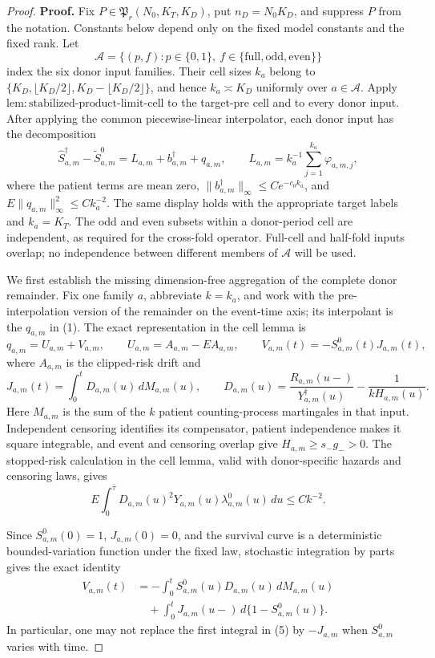 \documentclass{article}
\begin{document}
\begin{proof}
\textbf{Proof.}
Fix \(P\in\mathfrak P_r(N_0,K_T,K_D)\), put
\(n_D=N_0K_D\), and suppress \(P\) from the notation.  Constants below
depend only on the fixed model constants and the fixed rank.  Let
\[
 \mathscr A=\{(p,f):p\in\{0,1\},\
 f\in\{\mathrm{full},\mathrm{odd},\mathrm{even}\}\}
\]
index the six donor input families.  Their cell sizes \(k_a\) belong to
\(\{K_D,\lfloor K_D/2\rfloor,K_D-\lfloor K_D/2\rfloor\}\), and hence
\(k_a\asymp K_D\) uniformly over \(a\in\mathscr A\).  Apply
\(\mathrm{lem:stabilized\mbox{-}product\mbox{-}limit\mbox{-}cell}\) to
the target-pre cell and to every donor input.  After applying the common
piecewise-linear interpolator, each donor input has the decomposition
\[
 \widehat S_{a,m}^{\dagger}-\widetilde S^0_{a,m}
 =L_{a,m}+b_{a,m}^{\dagger}+q_{a,m},
 \qquad
 L_{a,m}=k_a^{-1}\sum_{j=1}^{k_a}\varphi_{a,m,j},       \tag{1}
\]
where the patient terms are mean zero,
\(\|b_{a,m}^{\dagger}\|_\infty\leq Ce^{-c_0k_a}\), and
\(E\|q_{a,m}\|_\infty^2\leq Ck_a^{-2}\).  The same display holds with
the appropriate target labels and \(k_a=K_T\).  The odd and even subsets
within a donor-period cell are independent, as required for the cross-fold
operator.  Full-cell and half-fold inputs overlap; no independence between
different members of \(\mathscr A\) will be used.

We first establish the missing dimension-free aggregation of the complete
donor remainder.  Fix one family \(a\), abbreviate \(k=k_a\), and work with
the pre-interpolation version of the remainder on the event-time axis; its
interpolant is the \(q_{a,m}\) in (1).  The exact representation in the cell
lemma is
\[
 q_{a,m}=U_{a,m}+V_{a,m},
 \qquad
 U_{a,m}=A_{a,m}-EA_{a,m},
 \qquad
 V_{a,m}(t)=-S^0_{a,m}(t)J_{a,m}(t),                   \tag{2}
\]
where \(A_{a,m}\) is the clipped-risk drift and
\[
 J_{a,m}(t)=\int_0^tD_{a,m}(u)\,dM_{a,m}(u),
 \qquad
 D_{a,m}(u)=\frac{R_{a,m}(u-)}{Y_{a,m}^{\dagger}(u)}
             -\frac{1}{kH_{a,m}(u)}.                  \tag{3}
\]
Here \(M_{a,m}\) is the sum of the \(k\) patient counting-process
martingales in that input.  Independent censoring identifies its compensator,
patient independence makes it square integrable, and event and censoring
overlap give \(H_{a,m}\geq s_-g_->0\).  The stopped-risk calculation in
the cell lemma, valid with donor-specific hazards and censoring laws, gives
\[
 E\int_0^{\bar\tau}D_{a,m}(u)^2Y_{a,m}(u)
       \lambda^0_{a,m}(u)\,du\leq Ck^{-2}.             \tag{4}
\]

Since \(S^0_{a,m}(0)=1\), \(J_{a,m}(0)=0\), and the survival curve is a
deterministic bounded-variation function under the fixed law, stochastic
integration by parts gives the exact identity
\[
 \begin{split}
 V_{a,m}(t)
 &=-\int_0^tS^0_{a,m}(u)D_{a,m}(u)\,dM_{a,m}(u)\\
 &\quad+\int_0^tJ_{a,m}(u-)\,d\{1-S^0_{a,m}(u)\}.
 \end{split}                                           \tag{5}
\]
In particular, one may not replace the first integral in (5) by
\(-J_{a,m}\) when \(S^0_{a,m}\) varies with time.


\end{proof}
\end{document}

